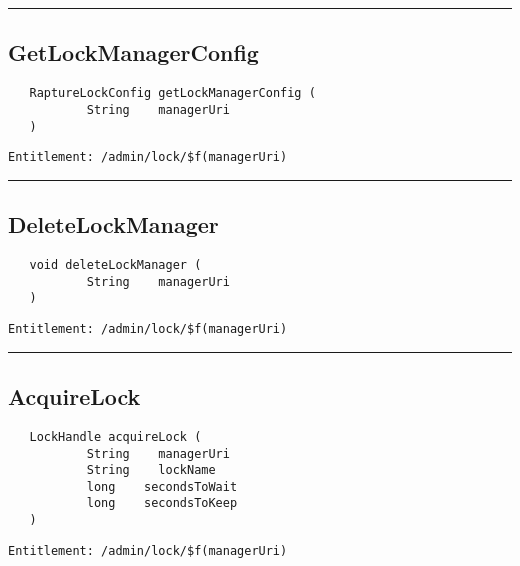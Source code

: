 \rule{12cm}{2pt}
\subsection{GetLockManagerConfig}
\label{Api:GetLockManagerConfig}
\begin{Verbatim}
   RaptureLockConfig getLockManagerConfig (
           String    managerUri
   )
\end{Verbatim}
\begin{Verbatim}[formatcom=\color{Maroon}]
  Entitlement: /admin/lock/$f(managerUri)
\end{Verbatim}



\rule{12cm}{2pt}
\subsection{DeleteLockManager}
\label{Api:DeleteLockManager}
\begin{Verbatim}
   void deleteLockManager (
           String    managerUri
   )
\end{Verbatim}
\begin{Verbatim}[formatcom=\color{Maroon}]
  Entitlement: /admin/lock/$f(managerUri)
\end{Verbatim}



\rule{12cm}{2pt}
\subsection{AcquireLock}
\label{Api:AcquireLock}
\begin{Verbatim}
   LockHandle acquireLock (
           String    managerUri
           String    lockName
           long    secondsToWait
           long    secondsToKeep
   )
\end{Verbatim}
\begin{Verbatim}[formatcom=\color{Maroon}]
  Entitlement: /admin/lock/$f(managerUri)
\end{Verbatim}



